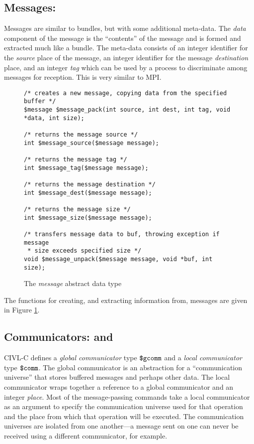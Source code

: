 \subsection{Messages: \cmessage}

Messages are similar to bundles, but with some additional meta-data.
The \emph{data} component of the message is the ``contents'' of the
message and is formed and extracted much like a bundle.  The meta-data
consists of an integer identifier for the \emph{source} place of the
message, an integer identifier for the message \emph{destination}
place, and an integer \emph{tag} which can be used by a process to
discriminate among messages for reception.  This is very similar to
MPI.

\begin{figure}
  \begin{small}
\begin{verbatim}
/* creates a new message, copying data from the specified buffer */ 
$message $message_pack(int source, int dest, int tag, void *data, int size);

/* returns the message source */ 
int $message_source($message message);

/* returns the message tag */
int $message_tag($message message);

/* returns the message destination */ 
int $message_dest($message message);

/* returns the message size */ 
int $message_size($message message);

/* transfers message data to buf, throwing exception if message
 * size exceeds specified size */ 
void $message_unpack($message message, void *buf, int size);
\end{verbatim}
  \end{small}
  \caption{The \emph{message} abstract data type}
  \label{fig:message}
\end{figure}

The functions for creating, and extracting information from, messages
are given in Figure \ref{fig:message}.

\subsection{Communicators: \cgcomm{} and \ccomm}
\label{sec:communicators}

CIVL-C defines a \emph{global communicator} type $\mbox{\texttt{\${}gcomm}}$ and a
\emph{local communicator} type $\mbox{\texttt{\${}comm}}$. The global communicator is an
abstraction for a ``communication universe'' that stores buffered
messages and perhaps other data.  The local communicator wraps
together a reference to a global communicator and an integer
\emph{place}.  Most of the message-passing commands take a local
communicator as an argument to specify the communication universe used
for that operation and the place from which that operation will be
executed.  The communication universes are isolated from one
another---a message sent on one can never be received using a
different communicator, for example.

